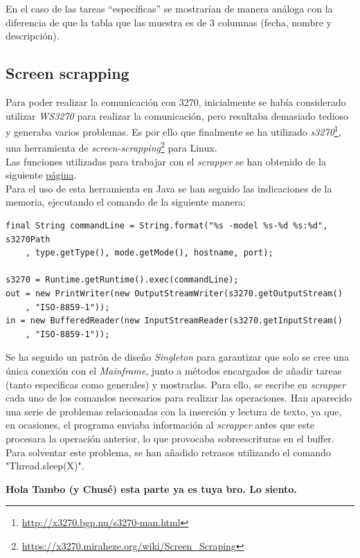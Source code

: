 \documentclass[10pt,a4paper]{article}
\begin{document}
En el caso de las tareas ``específicas'' se mostrarían de manera análoga con la diferencia de que la tabla que las muestra es de 3 columnas (fecha, nombre y descripción).


\subsection{Screen scrapping}

Para poder realizar la comunicación con 3270, inicialmente se había considerado utilizar \textit{WS3270} para realizar la comunicación, pero resultaba demasiado tedioso y generaba varios problemas. Es por ello que finalmente se ha utilizado \textit{s3270}\footnote{\url{http://x3270.bgp.nu/s3270-man.html}}, una herramienta de \textit{screen-scrapping}\footnote{\url{https://x3270.miraheze.org/wiki/Screen_Scraping}} para Linux. \\
Las funciones utilizadas para trabajar con el \textit{scrapper} se han obtenido de la siguiente \href{https://vebqa.github.io/f3270/release/doxygen/S3270_8java_source.html}{página}.\\
Para el uso de esta herramienta en Java se han seguido las indicaciones de la memoria, ejecutando el comando de la siguiente manera:
\begin{lstlisting}
final String commandLine = String.format("%s -model %s-%d %s:%d", s3270Path
	, type.getType(), mode.getMode(), hostname, port);

s3270 = Runtime.getRuntime().exec(commandLine);
out = new PrintWriter(new OutputStreamWriter(s3270.getOutputStream()
	, "ISO-8859-1"));
in = new BufferedReader(new InputStreamReader(s3270.getInputStream()
	, "ISO-8859-1"));
\end{lstlisting}
 
Se ha seguido un patrón de diseño \textit{Singleton} para garantizar que solo se cree una única conexión con el \textit{Mainframe}, junto a métodos encargados de añadir tareas (tanto específicas como generales) y mostrarlas. Para ello, se escribe en \textit{scrapper} cada uno de los comandos necesarios para realizar las operaciones. Han aparecido una serie de problemas relacionadas con la inserción y lectura de texto, ya que, en ocasiones, el programa enviaba información al \textit{scrapper} antes que este procesara la operación anterior, lo que provocaba sobreescrituras en el buffer. Para solventar este problema, se han añadido retrasos utilizando el comando "Thread.sleep(X)".

\textbf{{\Huge Hola Tambo (y Chusé) esta parte ya es tuya bro. Lo siento.}}
\end{document}
